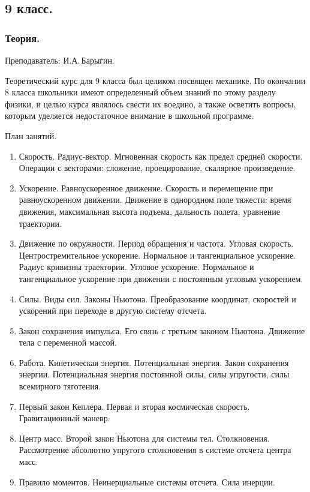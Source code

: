 \documentclass[12pt,a4paper,oneside,draft]{scrartcl}
\newlength{\h}
\newlength{\x}
\begin{document}
\subsection{9 класс.}
\label{sec:daily_9}

\subsubsection{Теория.}
\label{sec:daily_9_th}

\textsf{Преподаватель: И.А.\,Барыгин.}
\smallskip

Теоретический курс для 9 класса был целиком посвящен механике. По
окончании 8 класса школьники имеют определенный объем знаний по этому
разделу физики, и целью курса являлось свести их воедино, а также
осветить вопросы, которым уделяется недостаточное внимание в школьной
программе.

\begin{center}
  \textsf{План занятий.}
\end{center}

\begin{enumerate}
\item Скорость. Радиус-вектор. Мгновенная скорость как предел средней 
скорости. Операции с векторами: сложение, проецирование, скалярное 
произведение.
\item Ускорение. Равноускоренное движение. Скорость и перемещение при 
равноускоренном движении. Движение в однородном поле тяжести: время 
движения, максимальная высота подъема, дальность полета, уравнение 
траектории.
\item Движение по окружности. Период обращения и частота. Угловая 
скорость. Центростремительное ускорение. Нормальное и тангенциальное 
ускорение. Радиус кривизны траектории. Угловое ускорение. Нормальное 
и тангенциальное ускорение при движении с постоянным угловым 
ускорением.
\item Силы. Виды сил. Законы Ньютона. Преобразование координат, 
скоростей и ускорений при переходе в другую систему отсчета. 
\item Закон сохранения импульса. Его связь с третьим законом Ньютона. 
Движение тела с переменной массой.
\item Работа. Кинетическая энергия. Потенциальная энергия. Закон 
сохранения энергии. Потенциальная энергия постоянной силы, силы 
упругости, силы всемирного тяготения.
\item Первый закон Кеплера. Первая и вторая космическая скорость. 
Гравитационный маневр.
\item Центр масс. Второй закон Ньютона для системы тел. Столкновения. 
Рассмотрение абсолютно упругого столкновения в системе отсчета центра 
масс.
\item Правило моментов. Неинерциальные системы отсчета. Сила инерции.
\end{enumerate}
\end{document}
